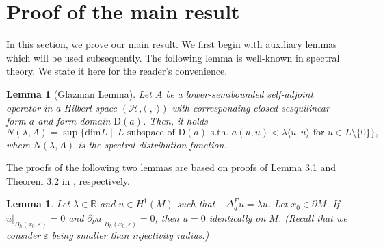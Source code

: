 \documentclass[12pt,a4paper]{amsart}
\numberwithin{equation}{section}
\theoremstyle{plain}
\newtheorem{lemma}[theorem]{Lemma}
\theoremstyle{definition}
\begin{document}
	\section{Proof of the main result}\label{proof_main_result}
	In this section, we prove our main result. We first begin with auxiliary lemmas which will be used subsequently. The following lemma is well-known in spectral theory. We state it here for the reader's convenience.
	\begin{lemma}[Glazman Lemma]\label{Glazman}
		Let $A$ be a lower-semibounded self-adjoint operator in a Hilbert space $\left(\mathcal{H}, \langle \cdot,\cdot\rangle\right)$ with corresponding closed sesquilinear form $a$ and form domain $\mathrm D(a)$. Then, it holds
		\begin{equation*}
			N(\lambda,A)=\sup \{\mathrm{dim} L\mid~ L \text{ subspace of } \mathrm D(a) \text{ s.th. } a(u,u)<\lambda\langle u,u\rangle \text{ for } u\in L \setminus \{ 0\} \},
		\end{equation*}
		where $N(\lambda,A)$ is the spectral distribution function.
	\end{lemma}
	
	The proofs of the following two lemmas are based on proofs of Lemma 3.1 and Theorem 3.2 in \cite{Rohleder}, respectively.
	\begin{lemma}\label{uniq_con}
		Let $\lambda \in \mathbb{R}$ and $u\in H^1(M)$ such that $-\Delta_g^F u = \lambda u$. Let $x_0\in \partial M$. If $u\left.\right|_{B_h(x_0,\varepsilon)} = 0$ and  $\partial_{\nu}u\left.\right|_{B_h(x_0,\varepsilon)} = 0$, then $u=0$ identically on $M$. (Recall that we consider $\varepsilon$ being smaller than injectivity radius.)
	\end{lemma}
	
\end{document}
